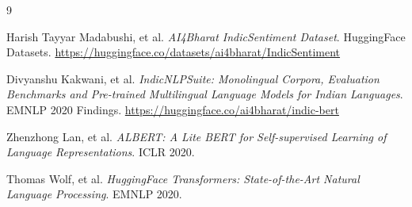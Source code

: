 \documentclass[11pt,a4paper]{article}
\begin{document}
\begin{thebibliography}{9}

Harish Tayyar Madabushi, et al.
\textit{AI4Bharat IndicSentiment Dataset}.
HuggingFace Datasets. 
\url{https://huggingface.co/datasets/ai4bharat/IndicSentiment}

Divyanshu Kakwani, et al.
\textit{IndicNLPSuite: Monolingual Corpora, Evaluation Benchmarks and Pre-trained Multilingual Language Models for Indian Languages}.
EMNLP 2020 Findings.
\url{https://huggingface.co/ai4bharat/indic-bert}

Zhenzhong Lan, et al.
\textit{ALBERT: A Lite BERT for Self-supervised Learning of Language Representations}.
ICLR 2020.

Thomas Wolf, et al.
\textit{HuggingFace Transformers: State-of-the-Art Natural Language Processing}.
EMNLP 2020.

\end{thebibliography}
\end{document}
